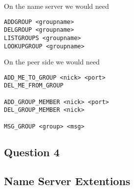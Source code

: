 On the name server we would need
\begin{lstlisting}
ADDGROUP <groupname>
DELGROUP <groupname>
LISTGROUPS <groupname>
LOOKUPGROUP <groupname>
\end{lstlisting}

On the peer side we would need
\begin{lstlisting}
ADD_ME_TO_GROUP <nick> <port>
DEL_ME_FROM_GROUP

ADD_GROUP_MEMBER <nick> <port>
DEL_GROUP_MEMBER <nick>

MSG_GROUP <group> <msg>
\end{lstlisting}

\subsection{Question 4}


\subsection{Name Server Extentions}
